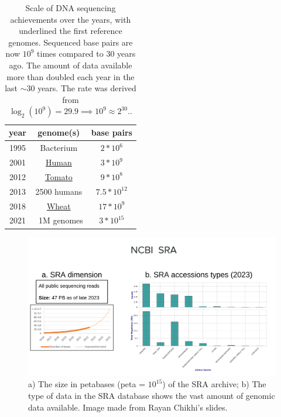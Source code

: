 \begin{table}[!ht]
	\centering
	\begin{tabular}{c | c | c}
		year & genome(s) & base pairs \\
		\hline
		1995 & Bacterium & $ 2*10^{6}$ \\
		2001 & \underline{Human} & $ 3*10^{9}$ \\
		2012 & \underline{Tomato} & $ 9*10^{8}$ \\
		2013 & 2500 humans & $ 7.5*10^{12}$ \\
		2018 & \underline{Wheat} & $ 17*10^{9} $ \\
		2021 & ~1M genomes & $ 3*10^{15}$ \\
	\end{tabular}
	\caption[Scale of DNA sequencing achievements over the years.]{Scale of DNA sequencing achievements over the years, with underlined the first reference genomes. Sequenced base pairs are now $10^9$ times compared to 30 years ago. The amount of data available more than doubled each year in the last $\sim30$ years. The rate was derived from $ \log_2(10^{9}) = 29.9 \implies 10^{9} \approx 2^{30}$.\cite{durbin_recomb}.}
	\label{tab:bp-increase}
\end{table}
\begin{figure}[h!]
	\centering
	\includegraphics[width=\linewidth]{figures/background/sra.png}
	\caption[The Sequence Read Archive.]{a) The size in petabases (peta = $10^{15}$) of the SRA archive; b) The type of data in the SRA database shows the vast amount of genomic data available. Image made from Rayan Chikhi's slides.\\}
	\label{fig:SRA}
\end{figure}

